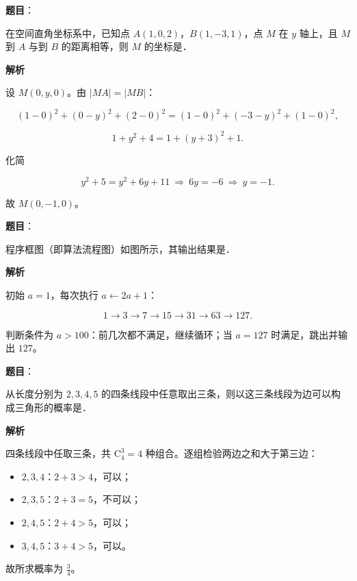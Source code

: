 \begin{answer}

\textbf{题目}：

在空间直角坐标系中，已知点 $A(1,0,2)$，$B(1,-3,1)$，点 $M$ 在 $y$ 轴上，且 $M$ 到 $A$ 与到 $B$ 的距离相等，则 $M$ 的坐标是\gkblank{}．

\textbf{解析}

设 $M(0,y,0)$。由 $|MA|=|MB|$：

\nopagebreak[4]
\[(1-0)^2+(0-y)^2+(2-0)^2=(1-0)^2+(-3-y)^2+(1-0)^2,\]

\nopagebreak[4]
\[1+y^2+4=1+(y+3)^2+1 .\]

化简

\nopagebreak[4]
\[y^2+5=y^2+6y+11\ \Longrightarrow\ 6y=-6\ \Longrightarrow\ y=-1 .\]

故 $M(0,-1,0)$。


\end{answer}
\begin{answer}

\textbf{题目}：

程序框图（即算法流程图）如图所示，其输出结果是\gkblank{}．
\nopagebreak[4]
\begin{center}\end{center}
\nopagebreak[4]
\textbf{解析}

初始 $a=1$，每次执行 $a\leftarrow2a+1$：

\nopagebreak[4]
\[1\to3\to7\to15\to31\to63\to127 .\]

判断条件为 $a>100$：前几次都不满足，继续循环；当 $a=127$ 时满足，跳出并输出 $127$。


\end{answer}
\begin{answer}

\textbf{题目}：

从长度分别为 $2,3,4,5$ 的四条线段中任意取出三条，则以这三条线段为边可以构成三角形的概率是\gkblank{}．

\textbf{解析}

四条线段中任取三条，共 $\mathrm C_4^3=4$ 种组合。逐组检验两边之和大于第三边：

\begin{itemize}
\item $2,3,4$：$2+3>4$，可以；
\item $2,3,5$：$2+3=5$，不可以；
\item $2,4,5$：$2+4>5$，可以；
\item $3,4,5$：$3+4>5$，可以。
\end{itemize}

故所求概率为 $\frac34$。


\end{answer}
